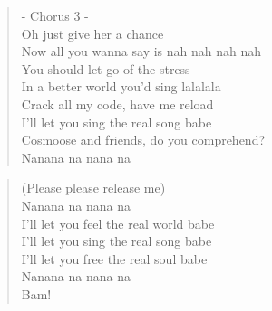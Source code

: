 \clearpage
{}


\begin{verse}
- Chorus 3 -\\
Oh just give her a chance\\
Now all you wanna say is nah nah nah nah\\
You should let go of the stress\\
In a better world you'd sing lalalala\\
Crack all my code, have me reload\\
I'll let you sing the real song babe\\
Cosmoose and friends, do you comprehend?\\
Nanana na nana na
\end{verse}

\begin{verse}
(Please please release me)\\
Nanana na nana na\\
I'll let you feel the real world babe\\
I'll let you sing the real song babe\\
I'll let you free the real soul babe\\
Nanana na nana na\\
Bam!
\end{verse}

\clearpage
